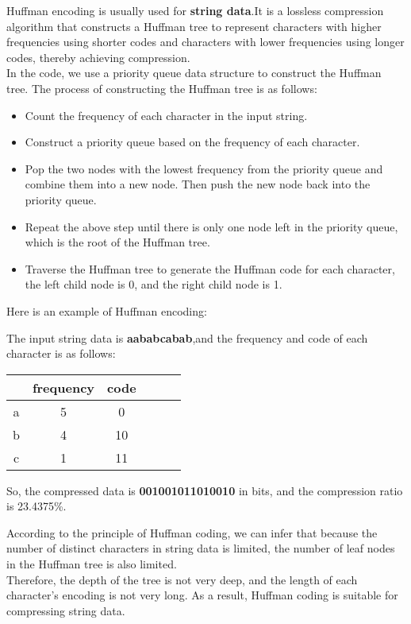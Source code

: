 \documentclass[sigconf]{acmart}
\begin{document}
    Huffman encoding is usually used for \textbf{string data}.It is a lossless compression algorithm that constructs a Huffman tree to represent characters with higher frequencies using shorter codes and characters with lower frequencies using longer codes, thereby achieving compression. \\
    In the code, we use a priority queue data structure to construct the Huffman tree. The process of constructing the Huffman tree is as follows:
    \begin{itemize}
        \item Count the frequency of each character in the input string.
        \item Construct a priority queue based on the frequency of each character.
        \item Pop the two nodes with the lowest frequency from the priority queue and combine them into a new node. Then push the new node back into the priority queue.
        \item Repeat the above step until there is only one node left in the priority queue, which is the root of the Huffman tree.
        \item Traverse the Huffman tree to generate the Huffman code for each character, the left child node is 0, and the right child node is 1.
    \end{itemize}

    Here is an example of Huffman encoding:

    The input string data is \textbf{aababcabab},and the frequency and code of each character is as follows:

    \begin{tabular}{c |c c c c c}
        \hline\hline
        & frequency & code \\
        \hline
        a & 5 & 0 \\
        b & 4 & 10 \\
        c & 1 & 11 \\
	\hline
	\end{tabular}

    So, the compressed data is \textbf{001001011010010} in bits, and the compression ratio is 23.4375\%.

    According to the principle of Huffman coding, we can infer that because the number of distinct characters in string data is limited, the number of leaf nodes in the Huffman tree is also limited. \\
    Therefore, the depth of the tree is not very deep, and the length of each character's encoding is not very long. As a result, Huffman coding is suitable for compressing string data.\\
\end{document}
